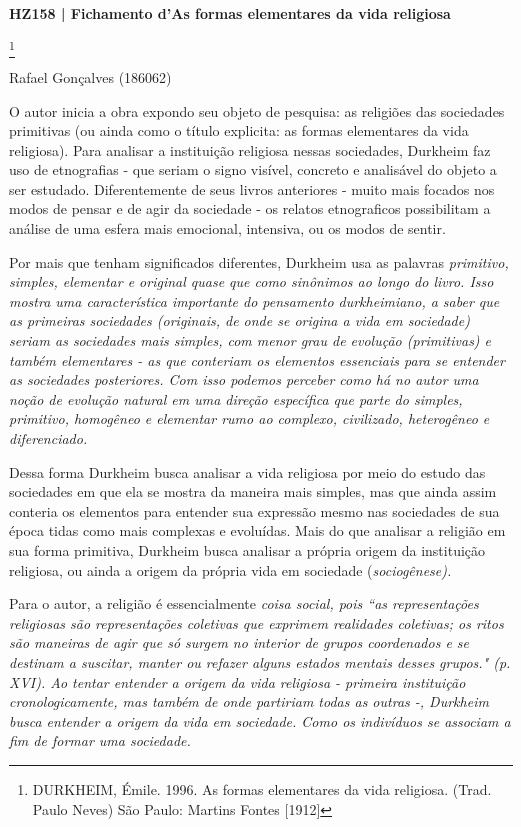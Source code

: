 \documentclass[12pt,a4paper]{article}
\begin{document}
\noindent
\centerline{\large\textbf{HZ158 | Fichamento d'As formas elementares da vida religiosa}}\footnote{DURKHEIM, Émile. 1996. As formas elementares da vida religiosa. (Trad. Paulo Neves) São Paulo: Martins Fontes [1912]}
\centerline{\large Rafael Gonçalves (186062)}
\break
\noindent
O autor inicia a obra expondo seu objeto de pesquisa: as religiões das sociedades primitivas (ou ainda como o título explicita: as formas elementares da vida religiosa). Para analisar a instituição religiosa nessas sociedades, Durkheim faz uso de etnografias - que seriam o signo visível, concreto e analisável do objeto a ser estudado. Diferentemente de seus livros anteriores - muito mais focados nos modos de pensar e de agir da sociedade - os relatos etnograficos possibilitam a análise de uma esfera mais emocional, intensiva, ou os modos de sentir.

Por mais que tenham significados diferentes, Durkheim usa as palavras \em primitivo\em , \em simples\em , \em elementar \em e \em original \em quase que como sinônimos ao longo do livro. Isso mostra uma característica importante do pensamento durkheimiano, a saber que as primeiras sociedades (originais, de onde se origina a vida em sociedade) seriam as sociedades mais simples, com menor grau de evolução (primitivas) e também elementares - as que conteriam os elementos essenciais para se entender as sociedades posteriores. Com isso podemos perceber como há no autor uma noção de evolução \em natural \em em uma direção específica que parte do simples, primitivo, homogêneo e elementar rumo ao complexo, civilizado, heterogêneo e diferenciado.

Dessa forma Durkheim busca analisar a vida religiosa por meio do estudo das sociedades em que ela se mostra da maneira mais simples, mas que ainda assim conteria os elementos para entender sua expressão mesmo nas sociedades de sua época tidas como mais complexas e evoluídas. Mais do que analisar a religião em sua forma primitiva, Durkheim busca analisar a própria origem da instituição religiosa, ou ainda a origem da própria vida em sociedade (\em sociogênese\em ).

Para o autor, a religião é essencialmente \em coisa social\em, pois
``as representações religiosas são representações coletivas que exprimem realidades coletivas; os ritos são maneiras de agir que só surgem no interior de grupos coordenados e se destinam a suscitar, manter ou refazer alguns estados mentais desses grupos." (p. XVI).
Ao tentar entender a origem da vida religiosa - primeira instituição cronologicamente, mas também de onde partiriam todas as outras -, Durkheim busca entender a origem da vida em sociedade. Como os indivíduos se associam a fim de formar uma sociedade.
\end{document}

